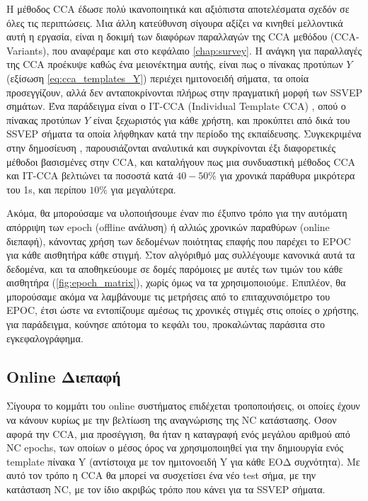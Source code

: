 \documentclass[11pt,a4paper,english,greek,twoside]{../Thesis}
\begin{document}
\par Η μέθοδος CCA έδωσε πολύ ικανοποιητικά και αξιόπιστα αποτελέσματα σχεδόν σε όλες τις περιπτώσεις. Μια άλλη κατεύθυνση σίγουρα αξίζει να κινηθεί μελλοντικά αυτή η εργασία, είναι η δοκιμή των διαφόρων παραλλαγών της CCA μεθόδου (CCA-Variants), που αναφέραμε και στο κεφάλαιο \ref{chap:survey}. Η ανάγκη για παραλλαγές της CCA προέκυψε καθώς ένα μειονέκτημα αυτής, είναι πως ο πίνακας προτύπων $Y$ (εξίσωση \eqref{eq:cca_templates_Y}) περιέχει ημιτονοειδή σήματα, τα οποία προσεγγίζουν, αλλά δεν ανταποκρίνονται πλήρως στην πραγματική μορφή των SSVEP σημάτων. Ένα παράδειγμα είναι ο IT-CCA (Individual Template CCA) \cite{Bin2011-eh}, οπού ο πίνακας προτύπων $Y$ είναι ξεχωριστός για κάθε χρήστη, και προκύπτει από δικά του SSVEP σήματα τα οποία λήφθηκαν κατά την περίοδο της εκπαίδευσης. Συγκεκριμένα στην δημοσίευση \cite{Nakanishi2015-md}, παρουσιάζονται αναλυτικά και συγκρίνονται έξι διαφορετικές μέθοδοι βασισμένες στην CCA, και καταλήγουν πως μια συνδυαστική μέθοδος CCA και IT-CCA βελτιώνει τα ποσοστά κατά $40-50\%$ για χρονικά παράθυρα μικρότερα του 1s, και περίπου $10\%$ για μεγαλύτερα. 

\par Ακόμα, θα μπορούσαμε να υλοποιήσουμε έναν πιο έξυπνο τρόπο για την αυτόματη απόρριψη των epoch (offline ανάλυση) ή αλλιώς χρονικών παραθύρων (online διεπαφή), κάνοντας χρήση των δεδομένων ποιότητας επαφής που παρέχει το EPOC για κάθε αισθητήρα κάθε στιγμή. Στον αλγόριθμό μας συλλέγουμε κανονικά αυτά τα δεδομένα, και τα αποθηκεύουμε σε δομές παρόμοιες με αυτές των τιμών του κάθε αισθητήρα (\ref{fig:epoch_matrix}), χωρίς όμως να τα χρησιμοποιούμε. Επιπλέον, θα μπορούσαμε ακόμα να λαμβάνουμε τις μετρήσεις από το επιταχυνσιόμετρο του EPOC, έτσι ώστε να εντοπίζουμε αμέσως τις χρονικές στιγμές στις οποίες ο χρήστης, για παράδειγμα, κούνησε απότομα το κεφάλι του, προκαλώντας παράσιτα στο εγκεφαλογράφημα.

\subsection{Online Διεπαφή}
\par Σίγουρα το κομμάτι του online συστήματος επιδέχεται τροποποιήσεις, οι οποίες έχουν να κάνουν κυρίως με την βελτίωση της αναγνώρισης της NC κατάστασης. Όσον αφορά την CCA, μια προσέγγιση, θα ήταν η καταγραφή ενός μεγάλου αριθμού από NC epochs, των οποίων ο μέσος όρος να χρησιμοποιηθεί για την δημιουργία ενός template πίνακα Y (αντίστοιχα με τον ημιτονοειδή Y για κάθε ΕΟΔ συχνότητα). Με αυτό τον τρόπο η CCA θα μπορεί να συσχετίσει ένα νέο test σήμα, με την κατάσταση NC, με τον ίδιο ακριβώς τρόπο που κάνει για τα SSVEP σήματα. 
\end{document}
